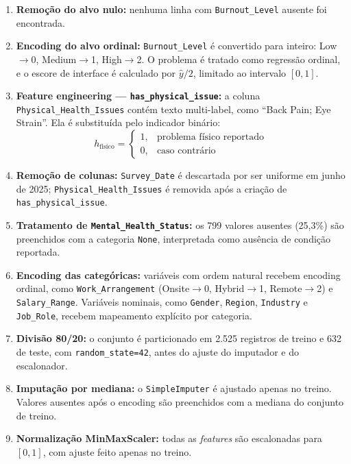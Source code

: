 \documentclass[conference]{IEEEtran}
\begin{document}
\begin{enumerate}
\item \textbf{Remoção do alvo nulo:} nenhuma linha com
\texttt{Burnout_Level} ausente foi encontrada.

\item \textbf{Encoding do alvo ordinal:} \texttt{Burnout\_Level}
      é convertido para inteiro: Low$\to$0, Medium$\to$1, High$\to$2.
      O problema é tratado como regressão ordinal, e o escore de
      interface é calculado por $\hat{y}/2$, limitado ao intervalo
      $[0,1]$.

\item \textbf{Feature engineering — \texttt{has\_physical\_issue}:}
      a coluna \texttt{Physical\_Health\_Issues} contém texto
      multi-label, como ``Back Pain; Eye Strain''. Ela é substituída
      pelo indicador binário:
      \begin{equation}
	      h_{\text{fisico}} =
	      \begin{cases}
		      1, & \text{problema físico reportado} \\
		      0, & \text{caso contrário}
	      \end{cases}
      \end{equation}

\item \textbf{Remoção de colunas:} \texttt{Survey\_Date} é descartada
      por ser uniforme em junho de 2025; \texttt{Physical\_Health\_Issues}
      é removida após a criação de \texttt{has\_physical\_issue}.

\item \textbf{Tratamento de \texttt{Mental\_Health\_Status}:}
      os 799 valores ausentes (25,3\%) são preenchidos com a categoria
      \texttt{None}, interpretada como ausência de condição reportada.

\item \textbf{Encoding das categóricas:} variáveis com ordem natural
      recebem encoding ordinal, como \texttt{Work\_Arrangement}
      (Onsite$\to$0, Hybrid$\to$1, Remote$\to$2) e
      \texttt{Salary\_Range}. Variáveis nominais, como \texttt{Gender},
      \texttt{Region}, \texttt{Industry} e \texttt{Job\_Role}, recebem
      mapeamento explícito por categoria.

\item \textbf{Divisão 80/20:} o conjunto é particionado em
      2.525 registros de treino e 632 de teste, com
      \texttt{random\_state=42}, antes do ajuste do imputador e do
      escalonador.

\item \textbf{Imputação por mediana:} o \texttt{SimpleImputer} é
      ajustado apenas no treino. Valores ausentes após o encoding são
      preenchidos com a mediana do conjunto de treino.

\item \textbf{Normalização MinMaxScaler:} todas as \textit{features}
      são escalonadas para $[0,1]$, com ajuste feito apenas no treino.

\end{enumerate}
\end{document}
